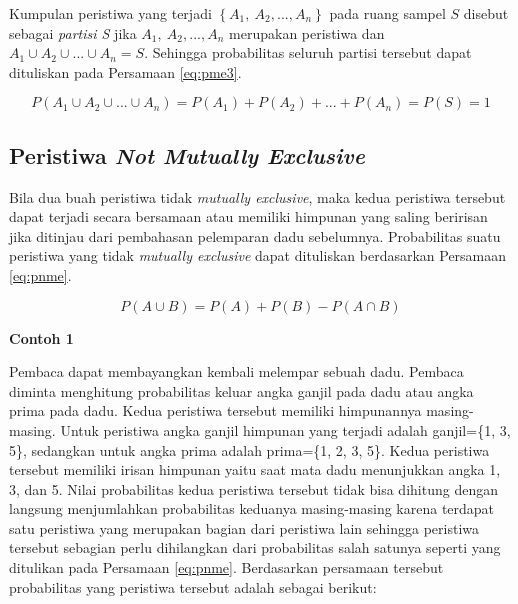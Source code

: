 \documentclass[]{book}
\begin{document}
Kumpulan peristiwa yang terjadi \(\left\{A_1,\ A_2,...,A_n\right\}\)
pada ruang sampel \(S\) disebut sebagai \emph{partisi S} jika
\(A_1,\ A_2,...,A_n\) merupakan peristiwa dan
\(A_1\cup A_2\cup...\cup A_n=S\). Sehingga probabilitas seluruh partisi
tersebut dapat dituliskan pada Persamaan \eqref{eq:pme3}.

\begin{equation}
   P\left(A_1\cup A_2\cup...\cup A_n\right)=P\left(A_1\right)+P\left(A_2\right)+...+P\left(A_n\right)=P\left(S\right)=1
  \label{eq:pme3}
\end{equation}

\subsection{\texorpdfstring{Peristiwa \emph{Not Mutually
Exclusive}}{Peristiwa Not Mutually Exclusive}}\label{peristiwa-not-mutually-exclusive}

Bila dua buah peristiwa tidak \emph{mutually exclusive}, maka kedua
peristiwa tersebut dapat terjadi secara bersamaan atau memiliki himpunan
yang saling beririsan jika ditinjau dari pembahasan pelemparan dadu
sebelumnya. Probabilitas suatu peristiwa yang tidak \emph{mutually
exclusive} dapat dituliskan berdasarkan Persamaan \eqref{eq:pnme}.

\begin{equation}
   P\left(A\cup B\right)=P\left(A\right)+P\left(B\right)-P\left(A\cap B\right)
  \label{eq:pnme}
\end{equation}

\textbf{Contoh 1}

Pembaca dapat membayangkan kembali melempar sebuah dadu. Pembaca diminta
menghitung probabilitas keluar angka ganjil pada dadu atau angka prima
pada dadu. Kedua peristiwa tersebut memiliki himpunannya masing-masing.
Untuk peristiwa angka ganjil himpunan yang terjadi adalah ganjil=\{1, 3,
5\}, sedangkan untuk angka prima adalah prima=\{1, 2, 3, 5\}. Kedua
peristiwa tersebut memiliki irisan himpunan yaitu saat mata dadu
menunjukkan angka 1, 3, dan 5. Nilai probabilitas kedua peristiwa
tersebut tidak bisa dihitung dengan langsung menjumlahkan probabilitas
keduanya masing-masing karena terdapat satu peristiwa yang merupakan
bagian dari peristiwa lain sehingga peristiwa tersebut sebagian perlu
dihilangkan dari probabilitas salah satunya seperti yang ditulikan pada
Persamaan \eqref{eq:pnme}. Berdasarkan persamaan tersebut probabilitas
yang peristiwa tersebut adalah sebagai berikut:
\end{document}
